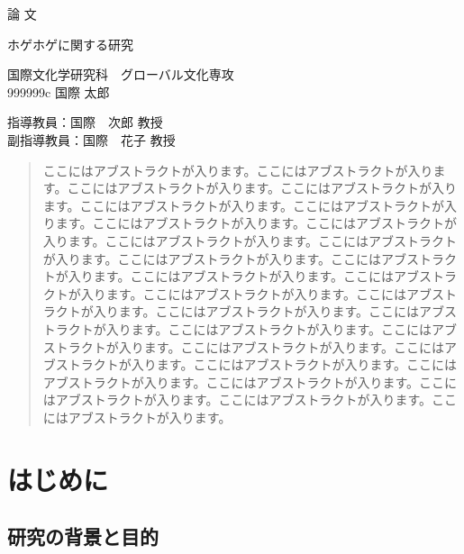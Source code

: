 \documentclass[11pt,a4j,uplatex]{jarticle}
\begin{document}
\begin{titlepage}
    \begin{center}
\vspace*{2cm}

\huge{論 文}

\vspace{1cm}

\huge{ホゲホゲに関する研究}

\vspace{5cm}

\LARGE{国際文化学研究科　グローバル文化専攻\\999999c 国際 太郎}

\vspace{4cm}

\LARGE{指導教員：国際　次郎 教授}\\
\LARGE{副指導教員：国際　花子 教授}

    \end{center}
\end{titlepage}

\tableofcontents
\newpage
\begin{abstract}
    ここにはアブストラクトが入ります。ここにはアブストラクトが入ります。ここにはアブストラクトが入ります。ここにはアブストラクトが入ります。ここにはアブストラクトが入ります。ここにはアブストラクトが入ります。ここにはアブストラクトが入ります。ここにはアブストラクトが入ります。ここにはアブストラクトが入ります。ここにはアブストラクトが入ります。ここにはアブストラクトが入ります。ここにはアブストラクトが入ります。ここにはアブストラクトが入ります。ここにはアブストラクトが入ります。ここにはアブストラクトが入ります。ここにはアブストラクトが入ります。ここにはアブストラクトが入ります。ここにはアブストラクトが入ります。ここにはアブストラクトが入ります。ここにはアブストラクトが入ります。ここにはアブストラクトが入ります。ここにはアブストラクトが入ります。ここにはアブストラクトが入ります。ここにはアブストラクトが入ります。ここにはアブストラクトが入ります。ここにはアブストラクトが入ります。ここにはアブストラクトが入ります。ここにはアブストラクトが入ります。
\end{abstract}

\section{はじめに}

    \subsection{研究の背景と目的}
\end{document}
